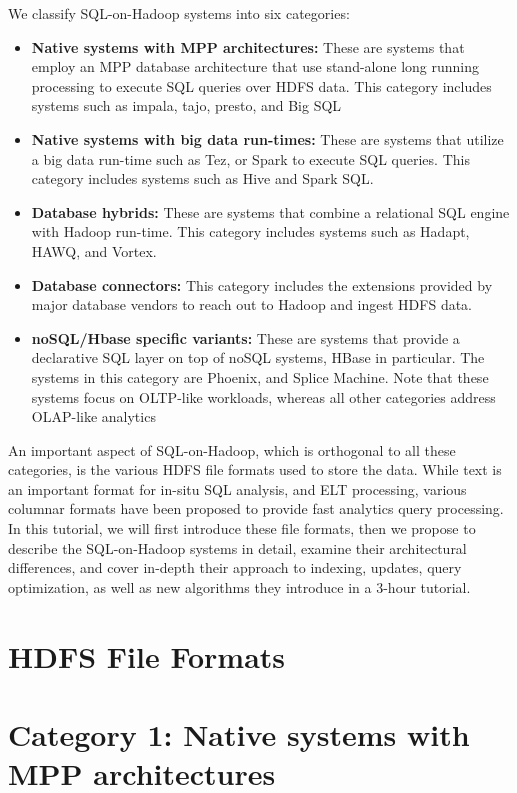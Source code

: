 \documentclass{vldb}
\begin{document}
We classify SQL-on-Hadoop systems into six categories:

\begin{itemize}
\item{ {\bf Native systems with MPP architectures:} These are systems that employ an MPP database architecture that use stand-alone long running processing to execute SQL queries over HDFS data. This category includes systems such as impala, tajo, presto, and Big SQL}
\item {{\bf Native systems with big data run-times:} These are systems that utilize a big data run-time such as Tez, or Spark to execute SQL queries. This category includes systems such as Hive and Spark SQL.}
\item{{\bf Database hybrids:} These are systems that combine a relational SQL engine with Hadoop run-time. This category includes systems such as Hadapt, HAWQ, and Vortex.}
\item{ {\bf Database connectors:} This category includes the extensions provided by major database vendors to reach out to Hadoop and ingest HDFS data. } 
\item{ {\bf noSQL/Hbase specific variants:} These are systems that provide a declarative SQL layer on top of noSQL systems, HBase in particular. The systems in this category are Phoenix, and Splice Machine. Note that these systems focus on OLTP-like workloads, whereas all other categories address OLAP-like analytics}
\end{itemize}

An important aspect of SQL-on-Hadoop, which is orthogonal to all these categories, is the various HDFS file formats used to store the data. While text is an important format for in-situ SQL analysis, and ELT processing, various columnar formats have been proposed to provide fast analytics query processing. In this tutorial, we will first introduce these file formats, then we propose to describe the SQL-on-Hadoop systems in detail, examine their architectural differences, and cover in-depth their approach to indexing, updates, query optimization, as well as new algorithms they introduce in a 3-hour tutorial. 

\section{HDFS File Formats}

\section{Category 1: Native systems with MPP architectures}
\end{document}
